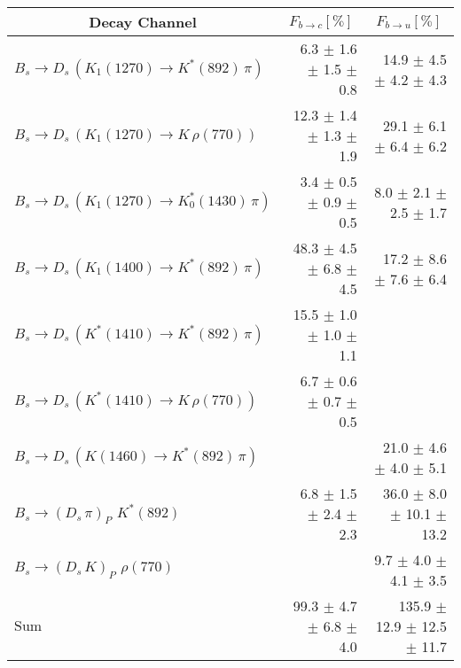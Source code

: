 \begin{tabular}{l r r } 
\hline
\hline
\multicolumn{1}{c}{Decay Channel} & \multicolumn{1}{c}{$F_{b \to c} [\%]$} & \multicolumn{1}{c}{$F_{b \to u} [\%]$}  \\ 
\hline
$B_s \to D_s \, ( K_1(1270) \to K^{*}(892) \, \pi )$ & 6.3 $\pm$ 1.6 $\pm$ 1.5 $\pm$ 0.8 & 14.9 $\pm$ 4.5 $\pm$ 4.2 $\pm$ 4.3 \\ 
$B_s \to D_s \, ( K_1(1270) \to K \, \rho(770) )$ & 12.3 $\pm$ 1.4 $\pm$ 1.3 $\pm$ 1.9 & 29.1 $\pm$ 6.1 $\pm$ 6.4 $\pm$ 6.2 \\ 
$B_s \to D_s \, ( K_1(1270) \to K^{*}_{0}(1430) \, \pi )$ & 3.4 $\pm$ 0.5 $\pm$ 0.9 $\pm$ 0.5 & 8.0 $\pm$ 2.1 $\pm$ 2.5 $\pm$ 1.7 \\ 
$B_s \to D_s \, ( K_1(1400) \to K^{*}(892) \, \pi )$ & 48.3 $\pm$ 4.5 $\pm$ 6.8 $\pm$ 4.5 & 17.2 $\pm$ 8.6 $\pm$ 7.6 $\pm$ 6.4 \\ 
$B_s \to D_s \, ( K^{*}(1410) \to K^{*}(892) \, \pi )$ & 15.5 $\pm$ 1.0 $\pm$ 1.0 $\pm$ 1.1 &  \\ 
$B_s \to D_s \, ( K^{*}(1410) \to K \, \rho(770) )$ & 6.7 $\pm$ 0.6 $\pm$ 0.7 $\pm$ 0.5 &  \\ 
$B_s \to D_s \, ( K(1460) \to K^{*}(892) \, \pi )$ &  & 21.0 $\pm$ 4.6 $\pm$ 4.0 $\pm$ 5.1 \\ 
$B_s \to ( D_s \, \pi)_{P} \, \, K^{*}(892)$ & 6.8 $\pm$ 1.5 $\pm$ 2.4 $\pm$ 2.3 & 36.0 $\pm$ 8.0 $\pm$ 10.1 $\pm$ 13.2 \\ 
$B_s \to ( D_s \, K)_{P} \, \, \rho(770)$ &  & 9.7 $\pm$ 4.0 $\pm$ 4.1 $\pm$ 3.5 \\ 
\hline
$\text{Sum}$ & 99.3 $\pm$ 4.7 $\pm$ 6.8 $\pm$ 4.0 & 135.9 $\pm$ 12.9 $\pm$ 12.5 $\pm$ 11.7 \\ 
\hline
\hline
\end{tabular}

